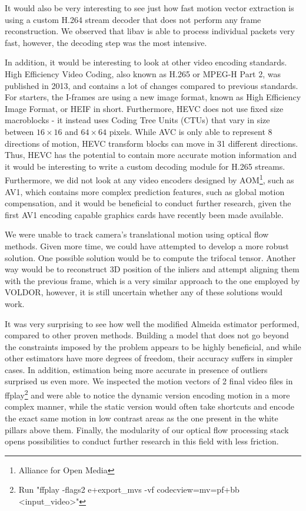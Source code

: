 \documentclass[11pt,english]{report}
\begin{document}
It would also be very interesting to see just how fast motion vector extraction is using a custom H.264 stream decoder that does not perform any frame reconstruction. We observed that libav is able to process individual packets very fast, however, the decoding step was the most intensive.

In addition, it would be interesting to look at other video encoding standards. High Efficiency Video Coding, also known as H.265 or MPEG-H Part 2, was published in 2013, and contains a lot of changes compared to previous standards. For starters, the I-frames are using a new image format, known as High Efficiency Image Format, or HEIF in short. Furthermore, HEVC does not use fixed size macroblocks - it instead uses Coding Tree Units (CTUs) that vary in size between $16 \times 16$ and $64 \times 64$ pixels\cite{h265}. While AVC is only able to represent 8 directions of motion, HEVC transform blocks can move in 31 different directions. Thus, HEVC has the potential to contain more accurate motion information and it would be interesting to write a custom decoding module for H.265 streams. Furthermore, we did not look at any video encoders designed by AOM\footnote{Alliance for Open Media}, such as AV1, which contains more complex prediction features, such as global motion compensation\cite{av1}\cite{av1_global_motion}, and it would be beneficial to conduct further research, given the first AV1 encoding capable graphics cards have recently been made available.

We were unable to track camera's translational motion using optical flow methods. Given more time, we could have attempted to develop a more robust solution. One possible solution would be to compute the trifocal tensor\cite{hartley_zisserman_2004}. Another way would be to reconstruct 3D position of the inliers and attempt aligning them with the previous frame, which is a very similar approach to the one employed by VOLDOR, however, it is still uncertain whether any of these solutions would work.

It was very surprising to see how well the modified Almeida estimator performed, compared to other proven methods. Building a model that does not go beyond the constraints imposed by the problem appears to be highly beneficial, and while other estimators have more degrees of freedom, their accuracy suffers in simpler cases. In addition, estimation being more accurate in presence of outliers surprised us even more. We inspected the motion vectors of 2 final video files in ffplay\footnote{Run "ffplay -flags2 e+export\_mvs -vf codecview=mv=pf+bb <input\_video>"} and were able to notice the dynamic version encoding motion in a more complex manner, while the static version would often take shortcuts and encode the exact same motion in low contrast areas as the one present in the white pillars above them. Finally, the modularity of our optical flow processing stack opens possibilities to conduct further research in this field with less friction.

\printbibliography
\end{document}

